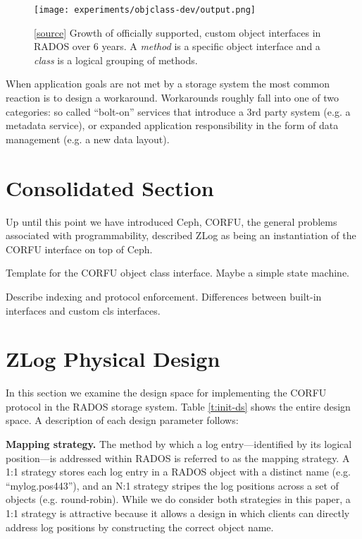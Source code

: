 \documentclass[10pt,twocolumn]{article}
\begin{document}
\begin{figure}[ht]
  \centering
    \texttt{[image: experiments/objclass-dev/output.png]}
    \caption{
[\href{https://github.com/noahdesu/zlog-popper/tree/master/experiments/objclass-dev/visualize.ipynb}{source}]
Growth of officially supported, custom object interfaces in RADOS over 6
years. A \emph{method} is a specific object interface and a \emph{class} is a
logical grouping of methods.
}
\label{fig:objclass-dev}
\end{figure}

When application goals are not met by a storage system the most common reaction
is to design a workaround. Workarounds roughly fall into one of two categories:
so called ``bolt-on'' services that introduce a 3rd party system (e.g. a
metadata service), or expanded application responsibility in the form of data
management (e.g. a new data layout).

\section{Consolidated Section}

Up until this point we have introduced Ceph, CORFU, the general problems
associated with programmability, described ZLog as being an instantiation of
the CORFU interface on top of Ceph.

Template for the CORFU object class interface. Maybe a simple state machine.

Describe indexing and protocol enforcement.
Differences between built-in interfaces and custom cls interfaces.


\section{ZLog Physical Design}

In this section we examine the design space for implementing the CORFU
protocol in the RADOS storage system. Table \ref{t:init-ds} shows the entire
design space. A description of each design parameter follows:

{\bf Mapping strategy.} The method by which a log entry---identified by its
logical position---is addressed within RADOS is referred to as the mapping
strategy. A 1:1 strategy stores each log entry in a RADOS object with a
distinct name (e.g. ``mylog.pos443''), and an N:1 strategy stripes the log
positions across a set of objects (e.g.  round-robin). While we do consider
both strategies in this paper, a 1:1 strategy is attractive because it allows
a design in which clients can directly address log positions by constructing
the correct object name.
\end{document}
